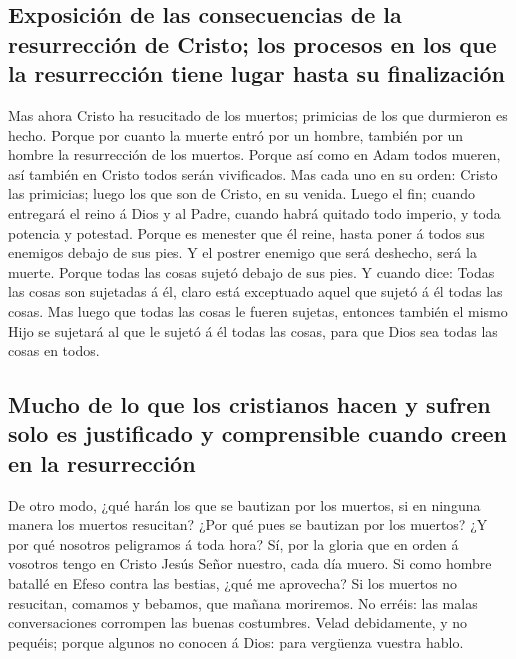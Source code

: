 \hypertarget{exposiciuxf3n-de-las-consecuencias-de-la-resurrecciuxf3n-de-cristo-los-procesos-en-los-que-la-resurrecciuxf3n-tiene-lugar-hasta-su-finalizaciuxf3n}{%
\subsection{Exposición de las consecuencias de la resurrección de
Cristo; los procesos en los que la resurrección tiene lugar hasta su
finalización}\label{exposiciuxf3n-de-las-consecuencias-de-la-resurrecciuxf3n-de-cristo-los-procesos-en-los-que-la-resurrecciuxf3n-tiene-lugar-hasta-su-finalizaciuxf3n}}

 Mas ahora Cristo ha resucitado de los muertos; primicias
de los que durmieron es hecho.  Porque por cuanto la muerte
entró por un hombre, también por un hombre la resurrección de los
muertos.  Porque así como en Adam todos mueren, así también
en Cristo todos serán vivificados.  Mas cada uno en su
orden: Cristo las primicias; luego los que son de Cristo, en su venida.
 Luego el fin; cuando entregará el reino á Dios y al Padre,
cuando habrá quitado todo imperio, y toda potencia y potestad.
 Porque es menester que él reine, hasta poner á todos sus
enemigos debajo de sus pies.  Y el postrer enemigo que será
deshecho, será la muerte.  Porque todas las cosas sujetó
debajo de sus pies. Y cuando dice: Todas las cosas son sujetadas á él,
claro está exceptuado aquel que sujetó á él todas las cosas.
 Mas luego que todas las cosas le fueren sujetas, entonces
también el mismo Hijo se sujetará al que le sujetó á él todas las cosas,
para que Dios sea todas las cosas en todos.

\hypertarget{mucho-de-lo-que-los-cristianos-hacen-y-sufren-solo-es-justificado-y-comprensible-cuando-creen-en-la-resurrecciuxf3n}{%
\subsection{Mucho de lo que los cristianos hacen y sufren solo es
justificado y comprensible cuando creen en la
resurrección}\label{mucho-de-lo-que-los-cristianos-hacen-y-sufren-solo-es-justificado-y-comprensible-cuando-creen-en-la-resurrecciuxf3n}}

 De otro modo, ¿qué harán los que se bautizan por los
muertos, si en ninguna manera los muertos resucitan? ¿Por qué pues se
bautizan por los muertos?  ¿Y por qué nosotros peligramos á
toda hora?  Sí, por la gloria que en orden á vosotros tengo
en Cristo Jesús Señor nuestro, cada día muero.  Si como
hombre batallé en Efeso contra las bestias, ¿qué me aprovecha? Si los
muertos no resucitan, comamos y bebamos, que mañana moriremos.
 No erréis: las malas conversaciones corrompen las buenas
costumbres.  Velad debidamente, y no pequéis; porque
algunos no conocen á Dios: para vergüenza vuestra hablo.

